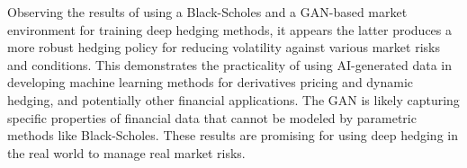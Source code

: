 \noindent Observing the results of using a Black-Scholes and a GAN-based market environment for training deep hedging methods, it appears the latter produces a more robust hedging policy for reducing volatility against various market risks and conditions. This demonstrates the practicality of using AI-generated data in developing machine learning methods for derivatives pricing and dynamic hedging, and potentially other financial applications. The GAN is likely capturing specific properties of financial data that cannot be modeled by parametric methods like Black-Scholes. These results are promising for using deep hedging in the real world to manage real market risks.
